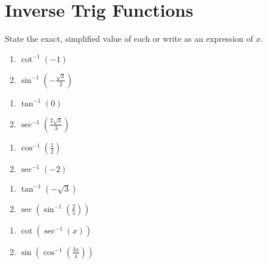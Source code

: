 \chapter{Inverse Trig Functions}

State the exact, simplified value of each or write as an expression of $x$.

\begin{multicols}{2}
\begin{enumerate}
	\item $\cot^{-1}\left(-1\right)$
	\item $\sin^{-1}\left(-\frac{\sqrt{3}}{2	}\right)$
\end{enumerate}	\setcounter{Review}{\value{enumi}}
\end{multicols}
\smallskip
\begin{multicols}{2}
\begin{enumerate}	\setcounter{enumi}{\value{Review}}
	\item $\tan^{-1}\left(0\right)$
	\item $\sec^{-1}\left(\frac{2\sqrt{3}}{3}\right)$
\end{enumerate}	\setcounter{Review}{\value{enumi}}
\end{multicols}
\smallskip
\begin{multicols}{2}
\begin{enumerate}	\setcounter{enumi}{\value{Review}}
	\item $\cos^{-1}\left(\frac{1}{2}\right)$
	\item $\sec^{-1}\left(-2\right)$
\end{enumerate}	\setcounter{Review}{\value{enumi}}
\end{multicols}
\smallskip
\begin{multicols}{2}
\begin{enumerate}	\setcounter{enumi}{\value{Review}}
	\item $\tan^{-1}\left(-\sqrt{3}\right)$
	\item $\sec\left(\sin^{-1}\left(\frac{2}{5}\right)\right)$
\end{enumerate}	\setcounter{Review}{\value{enumi}}
\end{multicols}
\smallskip
\begin{multicols}{2}
\begin{enumerate}	\setcounter{enumi}{\value{Review}}
	\item $\cot\left(\sec^{-1}(x)\right)$
	\item $\sin\left(\cos^{-1}\left(\frac{3x}{4}\right)\right)$
\end{enumerate}	\setcounter{Review}{\value{enumi}}
\end{multicols}
